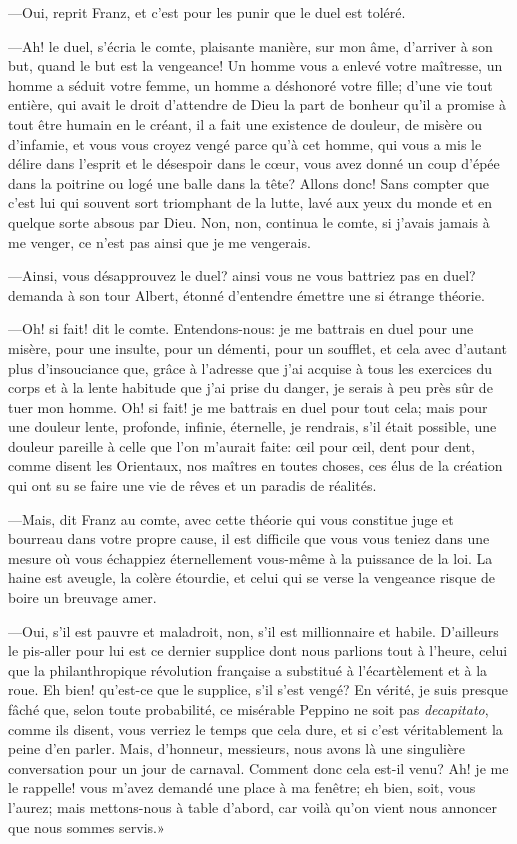 —Oui, reprit Franz, et c'est pour les punir que le duel est toléré. 

—Ah! le duel, s'écria le comte, plaisante manière, sur mon âme, d'arriver à son but, quand le but est la vengeance! Un homme vous a enlevé votre maîtresse, un homme a séduit votre femme, un homme a déshonoré votre fille; d'une vie tout entière, qui avait le droit d'attendre de Dieu la part de bonheur qu'il a promise à tout être humain en le créant, il a fait une existence de douleur, de misère ou d'infamie, et vous vous croyez vengé parce qu'à cet homme, qui vous a mis le délire dans l'esprit et le désespoir dans le cœur, vous avez donné un coup d'épée dans la poitrine ou logé une balle dans la tête? Allons donc! Sans compter que c'est lui qui souvent sort triomphant de la lutte, lavé aux yeux du monde et en quelque sorte absous par Dieu. Non, non, continua le comte, si j'avais jamais à me venger, ce n'est pas ainsi que je me vengerais. 

—Ainsi, vous désapprouvez le duel? ainsi vous ne vous battriez pas en duel? demanda à son tour Albert, étonné d'entendre émettre une si étrange théorie. 

—Oh! si fait! dit le comte. Entendons-nous: je me battrais en duel pour une misère, pour une insulte, pour un démenti, pour un soufflet, et cela avec d'autant plus d'insouciance que, grâce à l'adresse que j'ai acquise à tous les exercices du corps et à la lente habitude que j'ai prise du danger, je serais à peu près sûr de tuer mon homme. Oh! si fait! je me battrais en duel pour tout cela; mais pour une douleur lente, profonde, infinie, éternelle, je rendrais, s'il était possible, une douleur pareille à celle que l'on m'aurait faite: œil pour œil, dent pour dent, comme disent les Orientaux, nos maîtres en toutes choses, ces élus de la création qui ont su se faire une vie de rêves et un paradis de réalités. 

—Mais, dit Franz au comte, avec cette théorie qui vous constitue juge et bourreau dans votre propre cause, il est difficile que vous vous teniez dans une mesure où vous échappiez éternellement vous-même à la puissance de la loi. La haine est aveugle, la colère étourdie, et celui qui se verse la vengeance risque de boire un breuvage amer. 

—Oui, s'il est pauvre et maladroit, non, s'il est millionnaire et habile. D'ailleurs le pis-aller pour lui est ce dernier supplice dont nous parlions tout à l'heure, celui que la philanthropique révolution française a substitué à l'écartèlement et à la roue. Eh bien! qu'est-ce que le supplice, s'il s'est vengé? En vérité, je suis presque fâché que, selon toute probabilité, ce misérable Peppino ne soit pas \textit{decapitato}, comme ils disent, vous verriez le temps que cela dure, et si c'est véritablement la peine d'en parler. Mais, d'honneur, messieurs, nous avons là une singulière conversation pour un jour de carnaval. Comment donc cela est-il venu? Ah! je me le rappelle! vous m'avez demandé une place à ma fenêtre; eh bien, soit, vous l'aurez; mais mettons-nous à table d'abord, car voilà qu'on vient nous annoncer que nous sommes servis.» 

